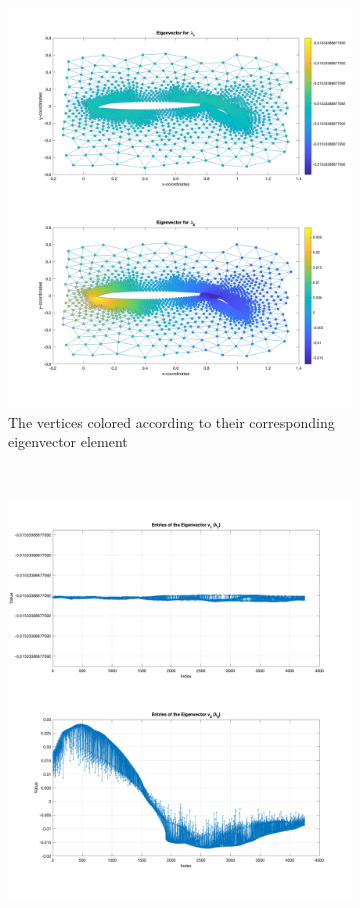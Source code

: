 \begin{figure}[H]
	\centering
	\begin{subfigure}{0.5\textwidth}
		\includegraphics[width=\textwidth]{./media/eigenvector.png}
		\caption{The vertices colored according to their corresponding eigenvector element}
		\label{sfig:eig1}
	\end{subfigure}%
	~
	\begin{subfigure}{0.5\textwidth}
		\includegraphics[width=\textwidth]{./media/eig_2.png}

\end{subfigure}
\end{figure}

